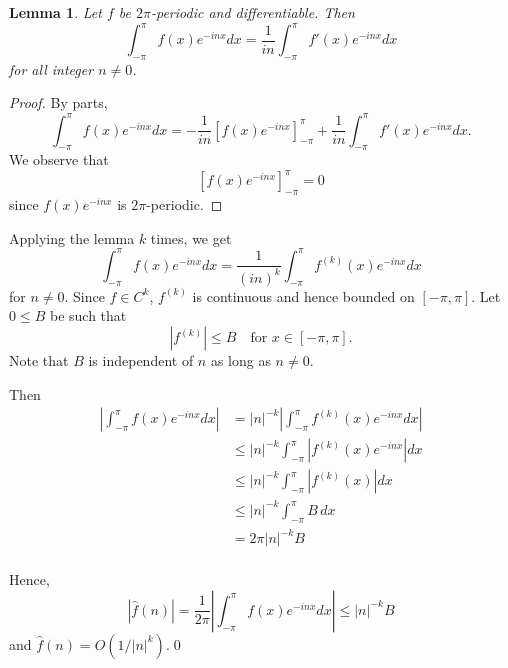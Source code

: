 \documentclass[oneside]{article}
\newcommand\abs[1]{\left|#1\right|}
\newtheorem*{lem}{Lemma}
\begin{document}
  \begin{lem}
    Let $f$ be $2\pi$-periodic and differentiable. Then\[
      \int_{-\pi}^\pi f(x)e^{-inx}dx
      = \frac{1}{in}\int_{-\pi}^\pi f'(x)e^{-inx}dx
    \] for all integer $n\neq0$.
  \end{lem}

  \begin{proof}
    By parts,
    \[
      \int_{-\pi}^\pi f(x)e^{-inx}dx
      = -\frac{1}{in}\left[f(x)e^{-inx}\right]_{-\pi}^\pi
      + \frac{1}{in}\int_{-\pi}^\pi f'(x)e^{-inx}dx \text{.}
    \] We observe that \[
      \left[f(x)e^{-inx}\right]_{-\pi}^\pi = 0
    \] since $f(x)e^{-inx}$ is $2\pi$-periodic.
  \end{proof}

  Applying the lemma $k$ times, we get \[
    \int_{-\pi}^\pi f(x)e^{-inx}dx
      = \frac{1}{(in)^k}\int_{-\pi}^\pi f^{(k)}(x)e^{-inx}dx
  \] for $n\neq0$. Since $f \in C^k$, $f^{(k)}$ is continuous and hence bounded
  on $[-\pi, \pi]$. Let $0 \leq B$ be such that \[
    \abs{f^{(k)}} \leq B\quad\text{for }x \in [-\pi, \pi] \text{.}
  \] Note that $B$ is independent of $n$ as long as $n\neq0$.

  Then \begin{align*}
    \abs{\int_{-\pi}^\pi f(x)e^{-inx}dx}
      &= \abs{n}^{-k}\abs{\int_{-\pi}^\pi f^{(k)}(x)e^{-inx}dx} \\
      &\leq \abs{n}^{-k}\int_{-\pi}^\pi \abs{f^{(k)}(x)e^{-inx}}dx \\
      &\leq \abs{n}^{-k}\int_{-\pi}^\pi \abs{f^{(k)}(x)}dx \\
      &\leq \abs{n}^{-k}\int_{-\pi}^\pi B\,dx \\
      &= 2\pi \abs{n}^{-k} B \\
  \end{align*}

  Hence, \[
    \abs{\hat f(n)} = \frac{1}{2\pi}\abs{\int_{-\pi}^\pi f(x)e^{-inx}dx}
    \leq \abs{n}^{-k}B
  \] and $\hat f(n) = O(1/\abs{n}^k)$.\qed
\end{document}
